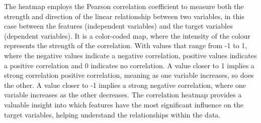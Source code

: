 The heatmap employs the Pearson correlation coefficient to measure both the strength and direction of the linear relationship between two variables, in this case between the features
(independent variables) and the target variables (dependent variables). It is a color-coded map, where the intensity of the colour represents the strength of the correlation.
With values that range from -1 to 1, where the negative values indicate a negative correlation, positive values indicates a positive correlation and 0 indicates no correlation.
A value closer to 1 implies a strong correlation positive correlation, meaning as one variable increases, so does the other. 
A value closer to -1 implies a strong negative correlation,
where one variable increases as the other decreases. The correlation heatmap provides a valuable insight into which features have the most
significant influence on the target variables, helping understand the relationships within the data. \cite{inglis2022visualizing}

